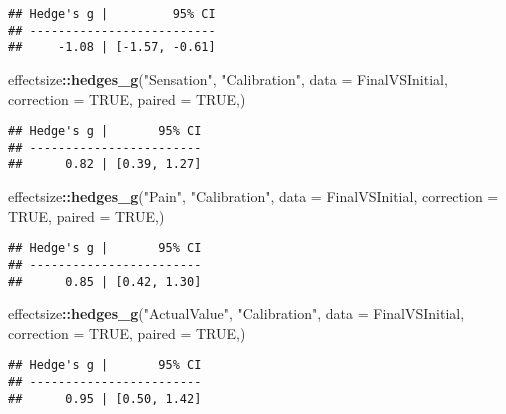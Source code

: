 \documentclass[
]{article}
\newenvironment{Shaded}{\begin{snugshade}}{\end{snugshade}}
\newcommand{\DataTypeTok}[1]{\textcolor[rgb]{0.13,0.29,0.53}{#1}}
\newcommand{\KeywordTok}[1]{\textcolor[rgb]{0.13,0.29,0.53}{\textbf{#1}}}
\newcommand{\NormalTok}[1]{#1}
\newcommand{\OperatorTok}[1]{\textcolor[rgb]{0.81,0.36,0.00}{\textbf{#1}}}
\newcommand{\OtherTok}[1]{\textcolor[rgb]{0.56,0.35,0.01}{#1}}
\newcommand{\StringTok}[1]{\textcolor[rgb]{0.31,0.60,0.02}{#1}}
\begin{document}
\begin{verbatim}
## Hedge's g |         95% CI
## --------------------------
##     -1.08 | [-1.57, -0.61]
\end{verbatim}

\begin{Shaded}
\begin{Highlighting}[]
\NormalTok{effectsize}\OperatorTok{::}\KeywordTok{hedges_g}\NormalTok{(}\StringTok{"Sensation"}\NormalTok{, }\StringTok{"Calibration"}\NormalTok{, }\DataTypeTok{data =}\NormalTok{ FinalVSInitial, }\DataTypeTok{correction =} \OtherTok{TRUE}\NormalTok{, }\DataTypeTok{paired =} \OtherTok{TRUE}\NormalTok{,)}
\end{Highlighting}
\end{Shaded}

\begin{verbatim}
## Hedge's g |       95% CI
## ------------------------
##      0.82 | [0.39, 1.27]
\end{verbatim}

\begin{Shaded}
\begin{Highlighting}[]
\NormalTok{effectsize}\OperatorTok{::}\KeywordTok{hedges_g}\NormalTok{(}\StringTok{"Pain"}\NormalTok{, }\StringTok{"Calibration"}\NormalTok{, }\DataTypeTok{data =}\NormalTok{ FinalVSInitial, }\DataTypeTok{correction =} \OtherTok{TRUE}\NormalTok{, }\DataTypeTok{paired =} \OtherTok{TRUE}\NormalTok{,)}
\end{Highlighting}
\end{Shaded}

\begin{verbatim}
## Hedge's g |       95% CI
## ------------------------
##      0.85 | [0.42, 1.30]
\end{verbatim}

\begin{Shaded}
\begin{Highlighting}[]
\NormalTok{effectsize}\OperatorTok{::}\KeywordTok{hedges_g}\NormalTok{(}\StringTok{"ActualValue"}\NormalTok{, }\StringTok{"Calibration"}\NormalTok{, }\DataTypeTok{data =}\NormalTok{ FinalVSInitial, }\DataTypeTok{correction =} \OtherTok{TRUE}\NormalTok{, }\DataTypeTok{paired =} \OtherTok{TRUE}\NormalTok{,)}
\end{Highlighting}
\end{Shaded}

\begin{verbatim}
## Hedge's g |       95% CI
## ------------------------
##      0.95 | [0.50, 1.42]
\end{verbatim}
\end{document}
